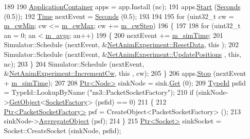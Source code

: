 \begin{DoxyCode}
189 
190     \hyperlink{classns3_1_1ApplicationContainer}{ApplicationContainer} apps = app.Install (nc);
191     apps.\hyperlink{classns3_1_1ApplicationContainer_a8eff87926507020bbe3e1390358a54a7}{Start} (\hyperlink{group__timecivil_ga33c34b816f8ff6628e33d5c8e9713b9e}{Seconds} (0.5));
192     \hyperlink{classns3_1_1Time}{Time} nextEvent = \hyperlink{group__timecivil_ga33c34b816f8ff6628e33d5c8e9713b9e}{Seconds} (0.5);
193 
194 
195     \textcolor{keywordflow}{for} (uint32\_t cw = \hyperlink{classNetAnimExperiment_a2d4b4380bbc3962d37415236ebc46f64}{m\_cwMin}; cw <= \hyperlink{classNetAnimExperiment_a36377073bd491b2213fd752da30e9362}{m\_cwMax}; cw += \hyperlink{classNetAnimExperiment_aca23676d0e5f1c69a82cea6d8d8af784}{m\_cwStep})
196       \{
197 
198         \textcolor{keywordflow}{for} (uint32\_t an = 0; an < \hyperlink{classNetAnimExperiment_aa5c4b8cecba30d0e970bd1ea1625af05}{m\_avgs}; an++)
199           \{
200             nextEvent += \hyperlink{classNetAnimExperiment_a647b3bc58c546fceefa722338e49db0a}{m\_simTime};
201             Simulator::Schedule (nextEvent, &\hyperlink{classNetAnimExperiment_a9ddd0a3abc2ce827381a1c7fa9fd2e32}{NetAnimExperiment::ResetData}, \textcolor{keyword}{this}
      );
202             Simulator::Schedule (nextEvent, &\hyperlink{classNetAnimExperiment_ac34d4ab03728c026626625a291284658}{NetAnimExperiment::UpdatePositions}
      , \textcolor{keyword}{this}, nc);
203           \}
204         Simulator::Schedule (nextEvent, &\hyperlink{classNetAnimExperiment_a12db4bf2df8db6997ea686d52081fe7e}{NetAnimExperiment::IncrementCw}, \textcolor{keyword}{this}
      , cw);
205       \}
206     apps.\hyperlink{classns3_1_1ApplicationContainer_adfc52f9aa4020c8714679b00bbb9ddb3}{Stop} (nextEvent + \hyperlink{classNetAnimExperiment_a647b3bc58c546fceefa722338e49db0a}{m\_simTime});
207 
208     \hyperlink{classns3_1_1Ptr}{Ptr<Node>} sinkNode = sink.\hyperlink{classns3_1_1NodeContainer_a9ed96e2ecc22e0f5a3d4842eb9bf90bf}{Get} (0);
209     \hyperlink{classns3_1_1TypeId}{TypeId} psfid = TypeId::LookupByName (\textcolor{stringliteral}{"ns3::PacketSocketFactory"});
210     \textcolor{keywordflow}{if} (sinkNode->\hyperlink{classns3_1_1Object_a13e18c00017096c8381eb651d5bd0783}{GetObject}<\hyperlink{classns3_1_1SocketFactory}{SocketFactory}> (psfid) == 0)
211       \{
212         \hyperlink{classns3_1_1Ptr}{Ptr<PacketSocketFactory>} psf = CreateObject<PacketSocketFactory> ();
213         sinkNode->\hyperlink{classns3_1_1Object_a79dd435d300f3deca814553f561a2922}{AggregateObject} (psf);
214       \}
215     \hyperlink{classns3_1_1Ptr}{Ptr<Socket>} sinkSocket = Socket::CreateSocket (sinkNode, psfid);

\end{DoxyCode}
